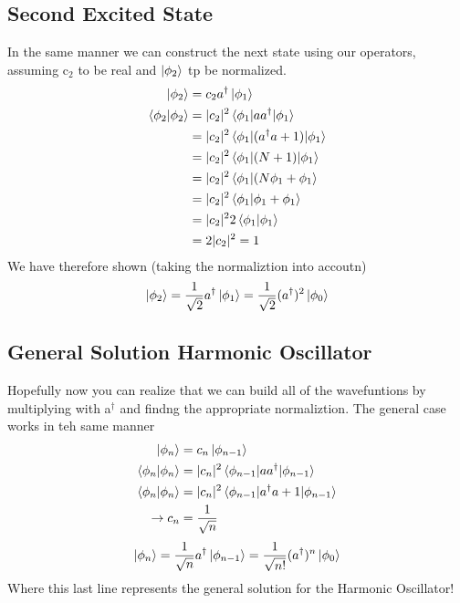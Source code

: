 \documentclass{article}
\newcommand{\be}{\begin{equation}}
\newcommand{\ee}{\end{equation}}
\newcommand{\dg}{\dagger}
\begin{document}
\subsection*{Second Excited State}
In the same manner we can construct the next state using our operators, assuming c$_2$ to be real and $\ket{\phi_2}$ tp be normalized. 
\be
\begin{split}
    \ket{\phi_2} &= c_2 a^\dg\ket{\phi_1}\\
    \braket{\phi_2|\phi_2} &= |c_2|^2 \braket{\phi_1|aa^\dg|\phi_1}\\
    &= |c_2|^2 \braket{\phi_1|(a^\dg a + 1)|\phi_1}\\
    &= |c_2|^2 \braket{\phi_1|(N + 1)|\phi_1}\\
    &= |c_2|^2 \braket{\phi_1|(N\phi_1 + \phi_1}\\
    &= |c_2|^2 \braket{\phi_1|\phi_1 + \phi_1}\\
    &= |c_2|^2 2\braket{\phi_1|\phi_1}\\
    &= 2|c_2|^2  = 1
\end{split}
\ee
We have therefore shown (taking the normaliztion into accoutn)
\be
\ket{\phi_2} = \frac{1}{\sqrt{2}}a^\dg\ket{\phi_1} = \frac{1}{\sqrt{2}}(a^\dg)^2\ket{\phi_0}
\ee

\subsection*{General Solution Harmonic Oscillator}
Hopefully now you can realize that we can build all of the wavefuntions by multiplying with a$^\dg$ and findng the appropriate normaliztion. 
The general case works in teh same manner
\be
\begin{split}
    \ket{\phi_n} &= c_n \ket{\phi_{n-1}}\\
    \braket{\phi_n|\phi_n} &= |c_n|^2 \braket{\phi_{n-1}|aa^\dg|\phi_{n-1}}\\
    \braket{\phi_n|\phi_n} &= |c_n|^2 \braket{\phi_{n-1}|a^\dg a + 1|\phi_{n-1}}\\
    \rightarrow c_n &= \frac{1}{\sqrt{n}}
\end{split}
\ee
\be
\ket{\phi_n} = \frac{1}{\sqrt{n}}a^\dg \ket{\phi_{n-1}} = \frac{1}{\sqrt{n!}}(a^\dg)^n \ket{\phi_0}
\ee
Where this last line represents the general solution for the Harmonic Oscillator!
\end{document}
